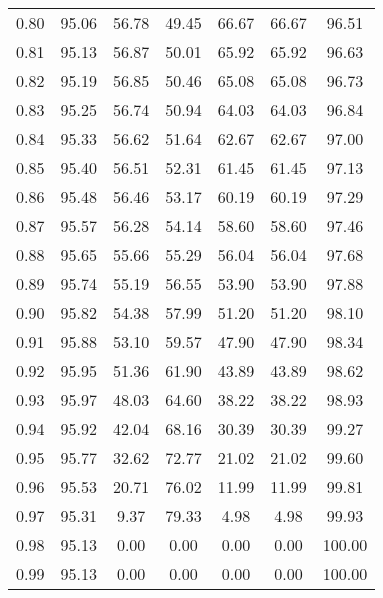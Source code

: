 \begin{tabular}{|c|c|c|c|c|c|c|}
      0.80 &     95.06 &     56.78 &      49.45 &   66.67 &      66.67 &         96.51 \\
      0.81 &     95.13 &     56.87 &      50.01 &   65.92 &      65.92 &         96.63 \\
      0.82 &     95.19 &     56.85 &      50.46 &   65.08 &      65.08 &         96.73 \\
      0.83 &     95.25 &     56.74 &      50.94 &   64.03 &      64.03 &         96.84 \\
      0.84 &     95.33 &     56.62 &      51.64 &   62.67 &      62.67 &         97.00 \\
      0.85 &     95.40 &     56.51 &      52.31 &   61.45 &      61.45 &         97.13 \\
      0.86 &     95.48 &     56.46 &      53.17 &   60.19 &      60.19 &         97.29 \\
      0.87 &     95.57 &     56.28 &      54.14 &   58.60 &      58.60 &         97.46 \\
      0.88 &     95.65 &     55.66 &      55.29 &   56.04 &      56.04 &         97.68 \\
      0.89 &     95.74 &     55.19 &      56.55 &   53.90 &      53.90 &         97.88 \\
      0.90 &     95.82 &     54.38 &      57.99 &   51.20 &      51.20 &         98.10 \\
      0.91 &     95.88 &     53.10 &      59.57 &   47.90 &      47.90 &         98.34 \\
      0.92 &     95.95 &     51.36 &      61.90 &   43.89 &      43.89 &         98.62 \\
      0.93 &     95.97 &     48.03 &      64.60 &   38.22 &      38.22 &         98.93 \\
      0.94 &     95.92 &     42.04 &      68.16 &   30.39 &      30.39 &         99.27 \\
      0.95 &     95.77 &     32.62 &      72.77 &   21.02 &      21.02 &         99.60 \\
      0.96 &     95.53 &     20.71 &      76.02 &   11.99 &      11.99 &         99.81 \\
      0.97 &     95.31 &      9.37 &      79.33 &    4.98 &       4.98 &         99.93 \\
      0.98 &     95.13 &      0.00 &       0.00 &    0.00 &       0.00 &        100.00 \\
      0.99 &     95.13 &      0.00 &       0.00 &    0.00 &       0.00 &        100.00 \\
\bottomrule
\end{tabular}
